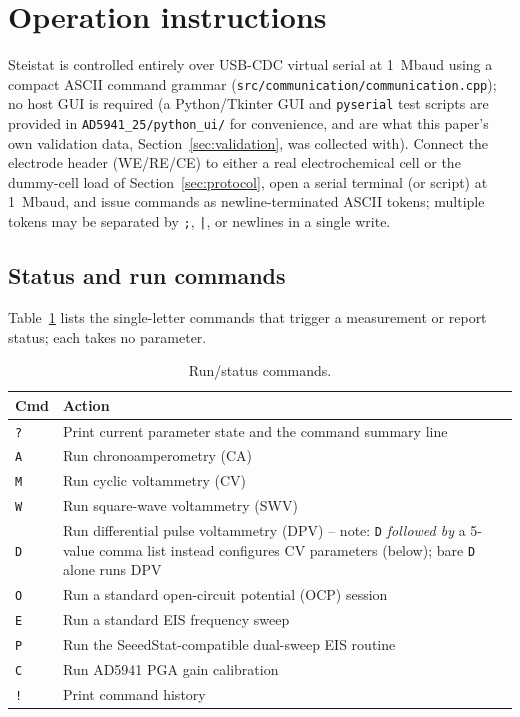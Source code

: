 \section{Operation instructions}
\label{sec:operation}

Steistat is controlled entirely over USB-CDC virtual serial at
\SI{1}{\mega baud} using a compact ASCII command grammar
(\texttt{src/communication/communication.cpp}); no host GUI is required
(a Python/Tkinter GUI and \texttt{pyserial} test scripts are provided in
\texttt{AD5941\_25/python\_ui/} for convenience, and are what this paper's
own validation data, Section~\ref{sec:validation}, was collected with).
Connect the electrode header (WE/RE/CE) to either a real electrochemical
cell or the dummy-cell load of Section~\ref{sec:protocol}, open a serial
terminal (or script) at \SI{1}{\mega baud}, and issue commands as
newline-terminated ASCII tokens; multiple tokens may be separated by
\texttt{;}, \texttt{|}, or newlines in a single write.

\subsection{Status and run commands}
Table~\ref{tab:runcmds} lists the single-letter commands that trigger a
measurement or report status; each takes no parameter.

\begin{table}[H]
\centering
\footnotesize
\setlength{\tabcolsep}{4pt}
\caption{Run/status commands.}
\label{tab:runcmds}
\begin{tabular}{@{}p{1.0cm}p{10.5cm}@{}}
\toprule
Cmd & Action \\
\midrule
\texttt{?} & Print current parameter state and the command summary line \\
\texttt{A} & Run chronoamperometry (CA) \\
\texttt{M} & Run cyclic voltammetry (CV) \\
\texttt{W} & Run square-wave voltammetry (SWV) \\
\texttt{D} & Run differential pulse voltammetry (DPV) -- note: \texttt{D}
  \emph{followed by} a 5-value comma list instead configures CV parameters
  (below); bare \texttt{D} alone runs DPV \\
\texttt{O} & Run a standard open-circuit potential (OCP) session \\
\texttt{E} & Run a standard EIS frequency sweep \\
\texttt{P} & Run the SeeedStat-compatible dual-sweep EIS routine \\
\texttt{C} & Run AD5941 PGA gain calibration \\
\texttt{!} & Print command history \\
\bottomrule
\end{tabular}
\end{table}

